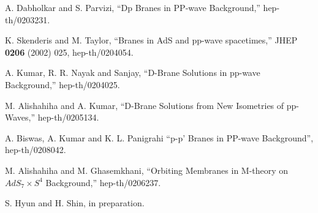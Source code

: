 \documentclass[a4paper,12pt]{article}
\begin{document}
\begin{thebibliography}{99}
 A. Dabholkar and S. Parvizi, ``Dp Branes in PP-wave
  Background,'' hep-th/0203231.
  
 K. Skenderis and M. Taylor, ``Branes in AdS and
  pp-wave spacetimes,'' JHEP {\bf 0206} (2002) 025, hep-th/0204054.
  
 A. Kumar, R. R. Nayak and Sanjay, ``D-Brane Solutions
  in pp-wave Background,'' hep-th/0204025.
  
 M. Alishahiha and A. Kumar, ``D-Brane Solutions from
  New Isometries of pp-Waves,'' hep-th/0205134.

 A. Biswas, A. Kumar and K. L. Panigrahi
``p-p' Branes in PP-wave Background'', hep-th/0208042.

 M. Alishahiha and M. Ghasemkhani, ``Orbiting
  Membranes in M-theory on $AdS_7 \times S^4$ Background,''
  hep-th/0206237.

 S. Hyun and H. Shin, in preparation. 

\end{thebibliography}
\end{document}
